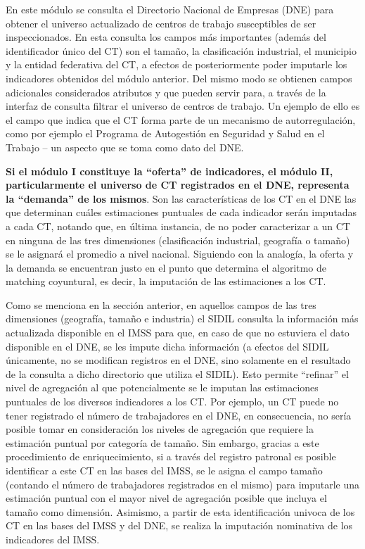 \documentclass[
]{article}
\begin{document}
En este módulo se consulta el Directorio Nacional de Empresas (DNE) para obtener el universo actualizado de centros de trabajo susceptibles de ser inspeccionados. En esta consulta los campos más importantes (además del identificador único del CT) son el tamaño, la clasificación industrial, el municipio y la entidad federativa del CT, a efectos de posteriormente poder imputarle los indicadores obtenidos del módulo anterior. Del mismo modo se obtienen campos adicionales considerados atributos y que pueden servir para, a través de la interfaz de consulta filtrar el universo de centros de trabajo. Un ejemplo de ello es el campo que indica que el CT forma parte de un mecanismo de autorregulación, como por ejemplo el Programa de Autogestión en Seguridad y Salud en el Trabajo -- un aspecto que se toma como dato del DNE.

\textbf{Si el módulo I constituye la ``oferta'' de indicadores, el módulo II, particularmente el universo de CT registrados en el DNE, representa la ``demanda'' de los mismos}. Son las características de los CT en el DNE las que determinan cuáles estimaciones puntuales de cada indicador serán imputadas a cada CT, notando que, en última instancia, de no poder caracterizar a un CT en ninguna de las tres dimensiones (clasificación industrial, geografía o tamaño) se le asignará el promedio a nivel nacional. Siguiendo con la analogía, la oferta y la demanda se encuentran justo en el punto que determina el algoritmo de matching coyuntural, es decir, la imputación de las estimaciones a los CT.

Como se menciona en la sección anterior, en aquellos campos de las tres dimensiones (geografía, tamaño e industria) el SIDIL consulta la información más actualizada disponible en el IMSS para que, en caso de que no estuviera el dato disponible en el DNE, se les impute dicha información (a efectos del SIDIL únicamente, no se modifican registros en el DNE, sino solamente en el resultado de la consulta a dicho directorio que utiliza el SIDIL). Esto permite ``refinar'' el nivel de agregación al que potencialmente se le imputan las estimaciones puntuales de los diversos indicadores a los CT. Por ejemplo, un CT puede no tener registrado el número de trabajadores en el DNE, en consecuencia, no sería posible tomar en consideración los niveles de agregación que requiere la estimación puntual por categoría de tamaño. Sin embargo, gracias a este procedimiento de enriquecimiento, si a través del registro patronal es posible identificar a este CT en las bases del IMSS, se le asigna el campo tamaño (contando el número de trabajadores registrados en el mismo) para imputarle una estimación puntual con el mayor nivel de agregación posible que incluya el tamaño como dimensión. Asimismo, a partir de esta identificación univoca de los CT en las bases del IMSS y del DNE, se realiza la imputación nominativa de los indicadores del IMSS.
\end{document}
